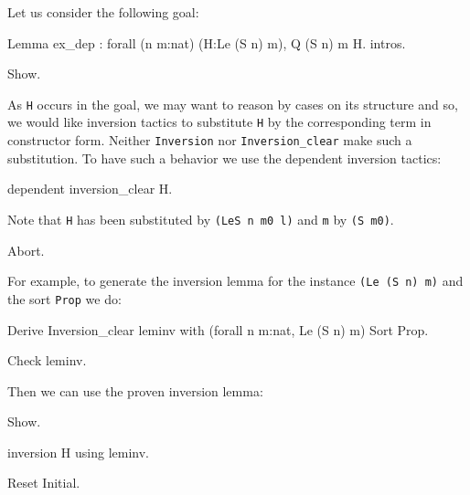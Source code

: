 \begin{coq_example*}
Let us consider the following goal:

\begin{coq_eval}
Lemma ex_dep : forall (n m:nat) (H:Le (S n) m), Q (S n) m H.
intros.
\end{coq_eval}

\begin{coq_example}
Show.
\end{coq_example}

As \texttt{H} occurs in the goal, we may want to reason by cases on its
structure and so, we would like  inversion tactics to
substitute \texttt{H} by the corresponding term in constructor form. 
Neither \texttt{Inversion} nor  {\tt Inversion\_clear} make such a
substitution. 
To have such a behavior we use the dependent inversion tactics:

\begin{coq_example}
dependent inversion_clear H.
\end{coq_example}

Note that \texttt{H} has been substituted by \texttt{(LeS n m0 l)} and
\texttt{m} by \texttt{(S m0)}.


\begin{coq_eval}
Abort.
\end{coq_eval}

For example, to generate the inversion lemma for the instance
\texttt{(Le (S n) m)} and the sort \texttt{Prop} we do:

\begin{coq_example*}
Derive Inversion_clear leminv with (forall n m:nat, Le (S n) m) Sort
 Prop.
\end{coq_example*}

\begin{coq_example}
Check leminv.
\end{coq_example}

Then we can use the proven inversion lemma:

\begin{coq_example}
Show.
\end{coq_example}

\begin{coq_example}
inversion H using leminv.
\end{coq_example}

\begin{coq_eval}
Reset Initial.
\end{coq_eval}


\end{coq_example*}
